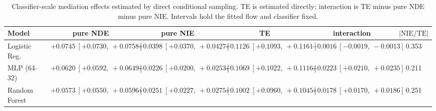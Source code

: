 \begin{table}[htbp]
  \centering
  \caption{Classifier-scale mediation effects estimated by direct conditional sampling. TE is estimated directly; interaction is TE minus pure NDE minus pure NIE. Intervals hold the fitted flow and classifier fixed.}
  \label{tab:acs_gap_overall}
  \begin{tabular}{lccccc}
    \toprule
    Model & pure NDE & pure NIE & TE & interaction & $|\mathrm{NIE}/\mathrm{TE}|$ \\
    \midrule
    Logistic Reg. & $+0.0745\ [+0.0730,\ +0.0758]$ & $+0.0398\ [+0.0370,\ +0.0427]$ & $+0.1126\ [+0.1093,\ +0.1161]$ & $-0.0016\ [-0.0019,\ -0.0013]$ & 0.353 \\
    MLP (64--32) & $+0.0620\ [+0.0592,\ +0.0649]$ & $+0.0226\ [+0.0200,\ +0.0253]$ & $+0.1069\ [+0.1022,\ +0.1116]$ & $+0.0223\ [+0.0210,\ +0.0235]$ & 0.211 \\
    Random Forest & $+0.0573\ [+0.0550,\ +0.0596]$ & $+0.0251\ [+0.0227,\ +0.0275]$ & $+0.1002\ [+0.0960,\ +0.1045]$ & $+0.0178\ [+0.0170,\ +0.0186]$ & 0.251 \\
    \bottomrule
  \end{tabular}
\end{table}